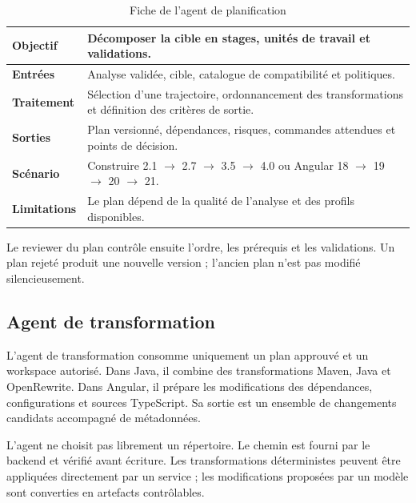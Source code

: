 \begin{table}[H]
    \centering
    \small
    \begin{tabularx}{\textwidth}{|>{\bfseries\RaggedRight\arraybackslash}p{3.2cm}|>{\RaggedRight\arraybackslash}X|}
        \hline
        Objectif & Décomposer la cible en stages, unités de travail et validations. \\
        \hline
        Entrées & Analyse validée, cible, catalogue de compatibilité et politiques. \\
        \hline
        Traitement & Sélection d'une trajectoire, ordonnancement des transformations et définition des critères de sortie. \\
        \hline
        Sorties & Plan versionné, dépendances, risques, commandes attendues et points de décision. \\
        \hline
        Scénario & Construire 2.1 $\rightarrow$ 2.7 $\rightarrow$ 3.5 $\rightarrow$ 4.0 ou Angular 18 $\rightarrow$ 19 $\rightarrow$ 20 $\rightarrow$ 21. \\
        \hline
        Limitations & Le plan dépend de la qualité de l'analyse et des profils disponibles. \\
        \hline
    \end{tabularx}
    \caption{Fiche de l'agent de planification}
    \label{tab:agent-planification-ch4}
\end{table}

Le reviewer du plan contrôle ensuite l'ordre, les prérequis et les validations. Un plan rejeté produit une nouvelle version ; l'ancien plan n'est pas modifié silencieusement.

\subsection{Agent de transformation}

L'agent de transformation consomme uniquement un plan approuvé et un workspace autorisé. Dans Java, il combine des transformations Maven, Java et OpenRewrite. Dans Angular, il prépare les modifications des dépendances, configurations et sources TypeScript. Sa sortie est un ensemble de changements candidats accompagné de métadonnées.

L'agent ne choisit pas librement un répertoire. Le chemin est fourni par le backend et vérifié avant écriture. Les transformations déterministes peuvent être appliquées directement par un service ; les modifications proposées par un modèle sont converties en artefacts contrôlables.

